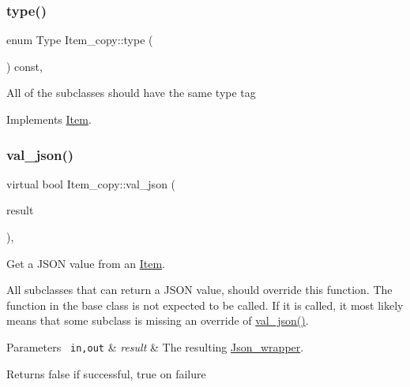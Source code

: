 \subsubsection{\texorpdfstring{type()}{type()}}
{\footnotesize\ttfamily enum Type Item\+\_\+copy\+::type (\begin{DoxyParamCaption}{ }\end{DoxyParamCaption}) const\hspace{0.3cm}{\ttfamily [inline]}, {\ttfamily [virtual]}}

All of the subclasses should have the same type tag 

Implements \mbox{\hyperlink{classItem}{Item}}.

\mbox{\label{classItem__copy_ab74e3b8e79f623d7caabec195ab69a11}} 
\subsubsection{\texorpdfstring{val\+\_\+json()}{val\_json()}}
{\footnotesize\ttfamily virtual bool Item\+\_\+copy\+::val\+\_\+json (\begin{DoxyParamCaption}\item[{\mbox{\hyperlink{classJson__wrapper}{Json\+\_\+wrapper}} $\ast$}]{result }\end{DoxyParamCaption})\hspace{0.3cm}{\ttfamily [inline]}, {\ttfamily [virtual]}}

Get a J\+S\+ON value from an \mbox{\hyperlink{classItem}{Item}}.

All subclasses that can return a J\+S\+ON value, should override this function. The function in the base class is not expected to be called. If it is called, it most likely means that some subclass is missing an override of \mbox{\hyperlink{classItem__copy_ab74e3b8e79f623d7caabec195ab69a11}{val\+\_\+json()}}.


\begin{DoxyParams}[1]{Parameters}
\mbox{\texttt{ in,out}}  & {\em result} & The resulting \mbox{\hyperlink{classJson__wrapper}{Json\+\_\+wrapper}}.\\
\hline
\end{DoxyParams}
\begin{DoxyReturn}{Returns}
false if successful, true on failure 
\end{DoxyReturn}


